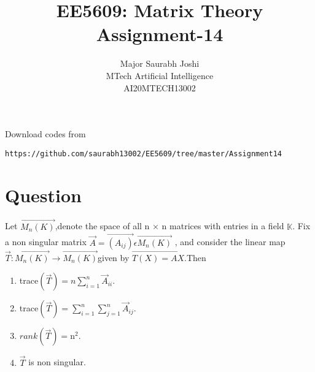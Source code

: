 \documentclass[journal,12pt,onecolumn]{IEEEtran}
\begin{document}
     \def\rightbox#1{\makebox[0in][r]{#1}}
     \def\centbox#1{\makebox[0in]{#1}}
     \def\topbox#1{\raisebox{-\baselineskip}[0in][0in]{#1}}
     \def\midbox#1{\raisebox{-0.5\baselineskip}[0in][0in]{#1}}
\vspace{3cm}
\onecolumn
\title{EE5609: Matrix Theory\\
          Assignment-14\\}
\author{Major Saurabh Joshi\\MTech Artificial Intelligence\\AI20MTECH13002 }
\maketitle
\bigskip
\renewcommand{\thefigure}{\theenumi}
\renewcommand{\thetable}{\theenumi}
Download codes from 
%
\begin{lstlisting}
https://github.com/saurabh13002/EE5609/tree/master/Assignment14
\end{lstlisting}
%
 
\section{Question}
Let $\vec{M_n(K)}$,denote the space of all n × n matrices with entries in a field $\mathbb{K}$. Fix a non singular matrix $\vec{A}=\vec{(A_{ij})}\epsilon \vec{M_n(K)}$ , and consider the linear map $\vec{T}:\vec{M_n(K)}\rightarrow\vec{M_n(K)}$given by $\vec{T(X)=AX}$.Then\\

\begin{enumerate}
\item trace$(\vec{T})=n\sum_{i=1}^n \vec{A}_{ii} .$
\item trace$(\vec{T})=\sum_{i=1}^n\sum_{j=1}^n \vec{A}_{ij} .$
\item $rank(\vec{T})=$n$^2$.
\item $\vec{T}$ is non singular.
\end{enumerate}
%
\end{document}
